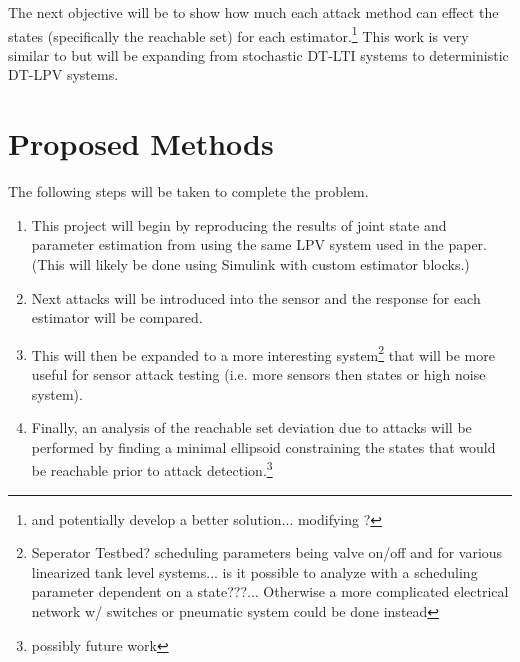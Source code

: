 \documentclass[]{article}
\begin{document}
The next objective will be to show how much each attack method can effect the states (specifically the reachable set) for each estimator.\footnote{and potentially develop a better solution... modifying \cite{securestateestimation}?} This work is very similar to \cite{hashemi2018comparison} but will be expanding from stochastic DT-LTI systems to deterministic DT-LPV systems.

\section{Proposed Methods}
The following steps will be taken to complete the problem.

\begin{enumerate}
	\item This project will begin by reproducing the results of joint state and parameter estimation from \cite{beelen2017joint} using the same LPV system used in the paper. (This will likely be done using Simulink with custom estimator blocks.)
	\item Next attacks will be introduced into the sensor and the response for each estimator will be compared.
	\item This will then be expanded to a more interesting system\footnote{Seperator Testbed? scheduling parameters being valve on/off and for various linearized tank level systems... is it possible to analyze with a scheduling parameter dependent on a state???... Otherwise a more complicated electrical network w/ switches or pneumatic system could be done instead} that will be more useful for sensor attack testing (i.e. more sensors then states or high noise system).
	\item Finally, an analysis of the reachable set deviation due to attacks will be performed by finding a minimal ellipsoid constraining the states that would be reachable prior to attack detection.\footnote{possibly future work}
\end{enumerate}

\newpage


\end{document}
